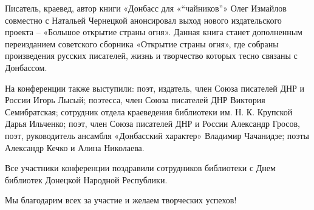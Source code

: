 
Писатель, краевед, автор книги «Донбасс для «\enquote{чайников}» Олег Измайлов
совместно с Натальей Чернецкой анонсировал выход нового издательского проекта –
«Большое открытие страны огня». Данная книга станет дополненным переизданием
советского сборника «Открытие страны огня», где собраны произведения русских
писателей, жизнь и творчество которых тесно связаны с Донбассом.

На конференции также выступили: поэт, издатель, член Союза писателей ДНР и
России Игорь Лысый; поэтесса, член Союза писателей ДНР Виктория Семибратская;
сотрудник отдела краеведения библиотеки им. Н. К. Крупской Дарья Ильченко; поэт,
член Союза писателей ДНР и России Александр Гросов, поэт, руководитель ансамбля
«Донбасский характер» Владимир Чачанидзе; поэты Александр Кечко и Алина
Николаева.

Все участники конференции поздравили сотрудников библиотеки с Днем библиотек
Донецкой Народной Республики.

Мы благодарим всех за участие и желаем творческих успехов!
